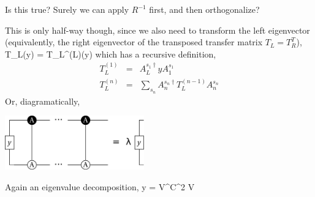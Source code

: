 \documentclass{article}[10pt]
\begin{document}
Is this true?   Surely we can apply $R^{-1}$ first, and then orthogonalize?


This is only half-way though, since we also need to transform
the left eigenvector (equivalently, the right eigenvector of the transposed transfer matrix $T_L = T_R^T$),
\beq
T_L(y) = T_L^{(L)}(y)
\eeq
which has a recursive definition,
\begin{eqnarray}
T_L^{(1)} &=&  A^{s_1\dagger}_L y A^{s_1}_1 \\
T_L^{(n)} &=& \sum_{s_n}  A^{s_n\dagger}_n T_L^{(n-1)} A^{s_n}_n
\end{eqnarray}
Or, diagramatically,

\begin{centering}
\includegraphics[width=6cm]{TransferLeft.pdf}\par
\end{centering}

Again an eigenvalue decomposition,
\beq
y = V^\dagger C^2 V
\eeq
\end{document}
